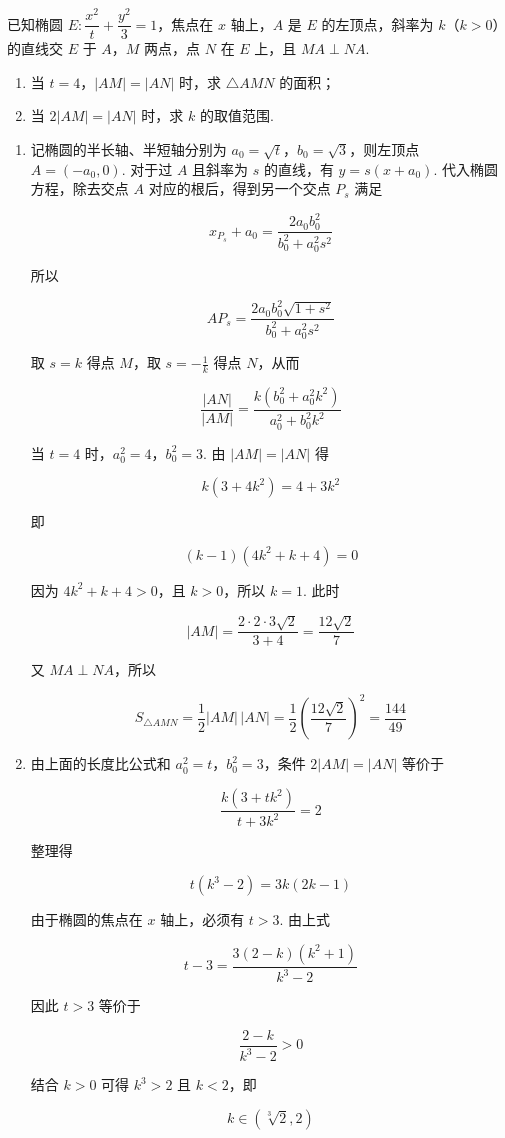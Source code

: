 \begin{problem}
已知椭圆 \(E:\dfrac{x^2}{t}+\dfrac{y^2}{3}=1\)，焦点在 \(x\) 轴上，\(A\) 是 \(E\) 的左顶点，斜率为 \(k\)（\(k>0\)）的直线交 \(E\) 于 \(A\)，\(M\) 两点，点 \(N\) 在 \(E\) 上，且 \(MA\perp NA\).
\begin{enumerate}
\item 当 \(t=4\)，\(\lvert AM\rvert=\lvert AN\rvert\) 时，求 \(\triangle AMN\) 的面积；
\item 当 \(2\lvert AM\rvert=\lvert AN\rvert\) 时，求 \(k\) 的取值范围.
\end{enumerate}
\end{problem}

\begin{solution}
\begin{enumerate}
\item 记椭圆的半长轴、半短轴分别为 \(a_0=\sqrt t\)，\(b_0=\sqrt3\)，则左顶点 \(A=(-a_0,0)\). 对于过 \(A\) 且斜率为 \(s\) 的直线，有 \(y=s(x+a_0)\). 代入椭圆方程，除去交点 \(A\) 对应的根后，得到另一个交点 \(P_s\) 满足

\[
x_{P_s}+a_0=\frac{2a_0b_0^2}{b_0^2+a_0^2s^2}
\]

所以

\[
AP_s=\frac{2a_0b_0^2\sqrt{1+s^2}}{b_0^2+a_0^2s^2}
\]

取 \(s=k\) 得点 \(M\)，取 \(s=-\frac{1}{k}\) 得点 \(N\)，从而

\[
\frac{|AN|}{|AM|}=\frac{k\left(b_0^2+a_0^2k^2\right)}{a_0^2+b_0^2k^2}
\]

当 \(t=4\) 时，\(a_0^2=4\)，\(b_0^2=3\). 由 \(|AM|=|AN|\) 得

\[
k(3+4k^2)=4+3k^2
\]

即

\[
(k-1)(4k^2+k+4)=0
\]

因为 \(4k^2+k+4>0\)，且 \(k>0\)，所以 \(k=1\). 此时

\[
|AM|=\frac{2\cdot2\cdot3\sqrt2}{3+4}=\frac{12\sqrt2}{7}
\]

又 \(MA\perp NA\)，所以

\[
S_{\triangle AMN}=\frac12|AM|\,|AN|=\frac12\left(\frac{12\sqrt2}{7}\right)^2=\frac{144}{49}
\]

\item 由上面的长度比公式和 \(a_0^2=t\)，\(b_0^2=3\)，条件 \(2|AM|=|AN|\) 等价于

\[
\frac{k(3+tk^2)}{t+3k^2}=2
\]

整理得

\[
t(k^3-2)=3k(2k-1)
\]

由于椭圆的焦点在 \(x\) 轴上，必须有 \(t>3\). 由上式

\[
t-3=\frac{3(2-k)(k^2+1)}{k^3-2}
\]

因此 \(t>3\) 等价于

\[
\frac{2-k}{k^3-2}>0
\]

结合 \(k>0\) 可得 \(k^3>2\) 且 \(k<2\)，即

\[
k\in\left(\sqrt[3]{2},2\right)
\]
\end{enumerate}
\end{solution}


